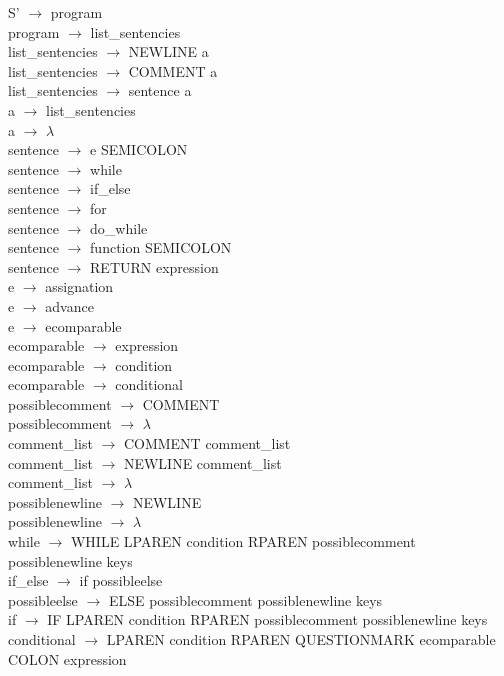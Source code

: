 \documentclass[10pt,a4paper]{article}
\begin{document}
S' $\rightarrow$ program \\ 
program $\rightarrow$ list\_sentencies \\
list\_sentencies $\rightarrow$ NEWLINE a \\
list\_sentencies $\rightarrow$ COMMENT a \\
list\_sentencies $\rightarrow$ sentence a \\
a $\rightarrow$ list\_sentencies \\
a $\rightarrow$ $\lambda$ \\
sentence $\rightarrow$ e SEMICOLON \\
sentence $\rightarrow$ while \\
sentence $\rightarrow$ if\_else \\
sentence $\rightarrow$ for \\
sentence $\rightarrow$ do\_while \\
sentence $\rightarrow$ function SEMICOLON \\
sentence $\rightarrow$ RETURN expression \\
e $\rightarrow$ assignation \\
e $\rightarrow$ advance \\
e $\rightarrow$ ecomparable \\
ecomparable $\rightarrow$ expression \\
ecomparable $\rightarrow$ condition \\
ecomparable $\rightarrow$ conditional \\
possiblecomment $\rightarrow$ COMMENT \\
possiblecomment $\rightarrow$ $\lambda$ \\
comment\_list $\rightarrow$ COMMENT comment\_list \\
comment\_list $\rightarrow$ NEWLINE comment\_list \\
comment\_list $\rightarrow$ $\lambda$ \\
possiblenewline $\rightarrow$ NEWLINE \\
possiblenewline $\rightarrow$ $\lambda$ \\
while $\rightarrow$ WHILE LPAREN condition RPAREN possiblecomment possiblenewline keys \\
if\_else $\rightarrow$ if possibleelse \\
possibleelse $\rightarrow$ ELSE possiblecomment possiblenewline keys \\
if $\rightarrow$ IF LPAREN condition RPAREN possiblecomment possiblenewline keys \\
conditional $\rightarrow$ LPAREN condition RPAREN QUESTIONMARK ecomparable COLON expression \\
\end{document}
